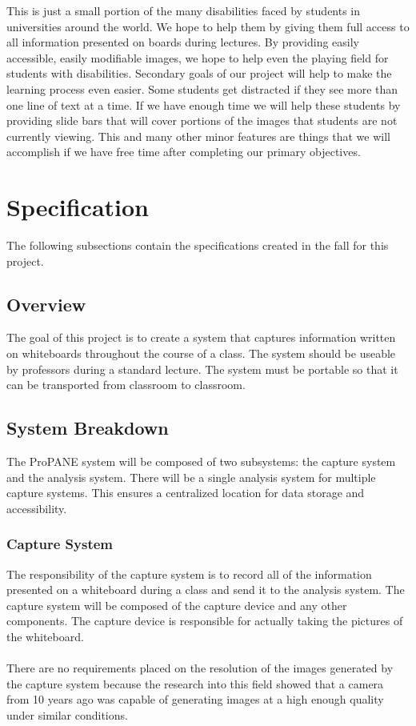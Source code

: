\documentclass[]{article}
\begin{document}
\noindent This is just a small portion of the many disabilities faced by students in universities around the world. We hope to help them by giving them full access to all information presented on boards during lectures. By providing easily accessible, easily modifiable images, we hope to help even the playing field for students with disabilities.
Secondary goals of our project will help to make the learning process even easier. Some students get distracted if they see more than one line of text at a time. If we have enough time we will help these students by providing slide bars that will cover portions of the images that students are not currently viewing. This and many other minor features are things that we will accomplish if we have free time after completing our primary objectives. 
		
		
	\section{Specification}
		The following subsections contain the specifications created in the fall for this project.
		\subsection{Overview}
			The goal of this project is to create a system that captures information written on whiteboards throughout the course of a class. The system should be useable by professors during a standard lecture. The system must be portable so that it can be transported from classroom to classroom.
			
		\subsection{System Breakdown}
			The ProPANE system will be composed of two subsystems: the capture system and the analysis system. There will be a single analysis system for multiple capture systems. This ensures a centralized location for data storage and accessibility.
			
			\subsubsection{Capture System}
				The responsibility of the capture system is to record all of the information presented on a whiteboard during a class and send it to the analysis system. The capture system will be composed of the capture device and any other components. The capture device is responsible for actually taking the pictures of the whiteboard.\\
				\\
				There are no requirements placed on the resolution of the images generated by the capture system because the research into this field showed that a camera from 10 years ago was capable of generating images at a high enough quality under similar conditions. 
				
\end{document}
